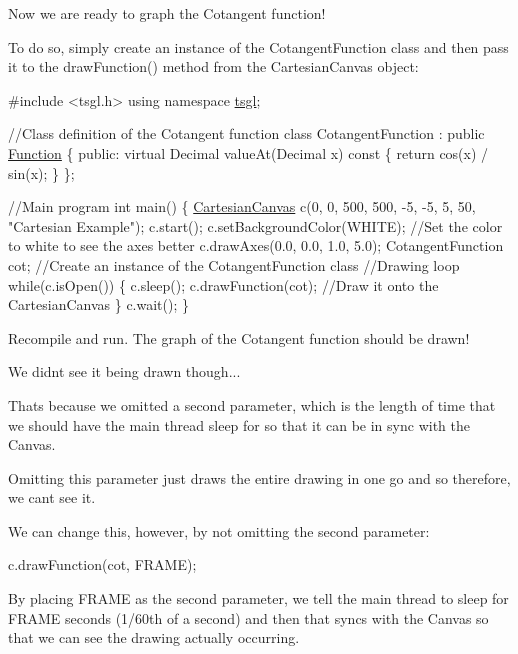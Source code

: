 Now we are ready to graph the Cotangent function!

To do so, simply create an instance of the Cotangent\+Function class and then pass it to the draw\+Function() method from the Cartesian\+Canvas object\+:


\begin{DoxyCode}
\textcolor{preprocessor}{#include <tsgl.h>}
\textcolor{keyword}{using namespace }\hyperlink{namespacetsgl}{tsgl};

\textcolor{comment}{//Class definition of the Cotangent function}
\textcolor{keyword}{class }CotangentFunction : \textcolor{keyword}{public} \hyperlink{classtsgl_1_1_function}{Function} \{
 \textcolor{keyword}{public}:
    \textcolor{keyword}{virtual} Decimal valueAt(Decimal x)\textcolor{keyword}{ const }\{
      \textcolor{keywordflow}{return} cos(x) / sin(x);
    \}
\};

\textcolor{comment}{//Main program}
\textcolor{keywordtype}{int} main() \{
  \hyperlink{classtsgl_1_1_cartesian_canvas}{CartesianCanvas} c(0, 0, 500, 500, -5, -5, 5, 50, \textcolor{stringliteral}{"Cartesian Example"});
  c.start();
  c.setBackgroundColor(WHITE);  \textcolor{comment}{//Set the color to white to see the axes better}
  c.drawAxes(0.0, 0.0, 1.0, 5.0);
  CotangentFunction cot;  \textcolor{comment}{//Create an instance of the CotangentFunction class}
  \textcolor{comment}{//Drawing loop}
  \textcolor{keywordflow}{while}(c.isOpen()) \{
    c.sleep();
    c.drawFunction(cot); \textcolor{comment}{//Draw it onto the CartesianCanvas}
  \}
  c.wait();
\}
\end{DoxyCode}


Recompile and run. The graph of the Cotangent function should be drawn!

We didn\textquotesingle{}t see it being drawn though...

That\textquotesingle{}s because we omitted a second parameter, which is the length of time that we should have the main thread sleep for so that it can be in sync with the Canvas.

Omitting this parameter just draws the entire drawing in one go and so therefore, we can\textquotesingle{}t see it.

We can change this, however, by not omitting the second parameter\+:


\begin{DoxyCode}
c.drawFunction(cot, FRAME);
\end{DoxyCode}


By placing F\+R\+A\+M\+E as the second parameter, we tell the main thread to sleep for F\+R\+A\+M\+E seconds (1/60th of a second) and then that syncs with the Canvas so that we can see the drawing actually occurring.

